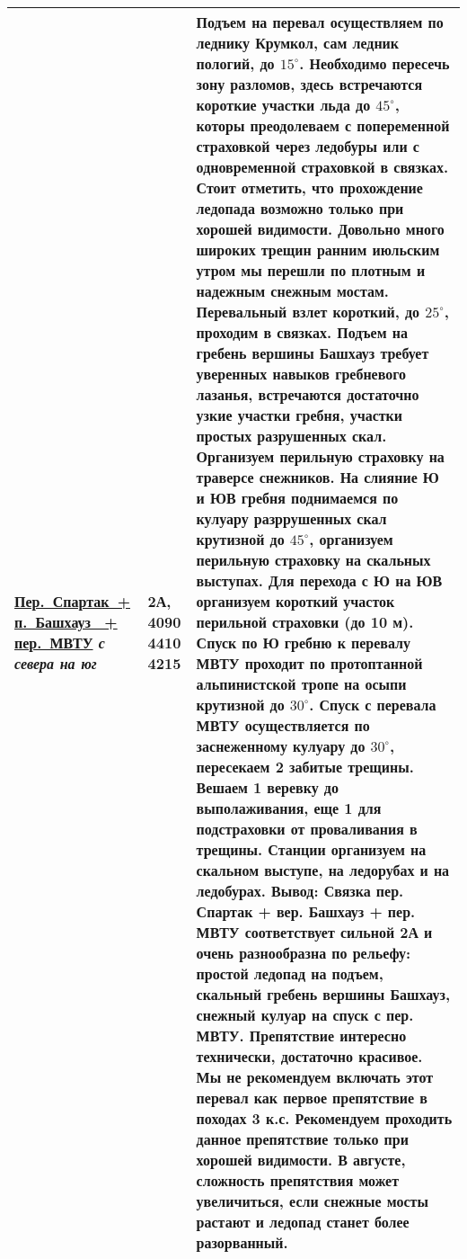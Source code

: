 {\begin{longtable}{|>{\centering\arraybackslash}m{3.8cm}|>{\centering\arraybackslash}m{1.3cm}|>{\raggedright\arraybackslash}m{12.5cm}|}
			\hyperref[subsec:Day6]{Пер.~Спартак~+ п.~Башхауз~ + пер.~МВТУ}											\newline\textit{с севера на юг}			&	2А, 4090 4410 4215			&	Подъем на перевал осуществляем по леднику Крумкол, сам ледник пологий, до $15^\circ$. Необходимо пересечь зону разломов, здесь встречаются короткие участки льда до $45^\circ$, которы преодолеваем с попеременной страховкой через ледобуры или с одновременной страховкой в связках. Стоит отметить, что прохождение ледопада возможно только при хорошей видимости. Довольно много широких трещин ранним июльским утром мы перешли по плотным и надежным снежным мостам. Перевальный взлет короткий, до $25^\circ$, проходим в связках. Подъем на гребень вершины Башхауз требует уверенных навыков гребневого лазанья, встречаются достаточно узкие участки гребня, участки простых разрушенных скал. Организуем перильную страховку на траверсе снежников. На слияние Ю и ЮВ гребня поднимаемся по кулуару разррушенных скал крутизной до $45^\circ$, организуем перильную страховку на скальных выступах. Для перехода с Ю на ЮВ организуем короткий участок перильной страховки (до 10 м). Спуск по Ю гребню к перевалу МВТУ проходит по протоптанной альпинистской тропе на осыпи крутизной до $30^\circ$. Спуск с перевала МВТУ осуществляется по заснеженному кулуару до $30^\circ$, пересекаем 2 забитые трещины. Вешаем 1 веревку до выполаживания, еще 1 для подстраховки от проваливания в трещины. Станции организуем на скальном выступе, на ледорубах и на ледобурах. \newline \textbf{Вывод:} Связка пер. Спартак + вер. Башхауз + пер. МВТУ соответствует сильной 2А и очень разнообразна по рельефу: простой ледопад на подъем, скальный гребень вершины Башхауз, снежный кулуар на спуск с пер. МВТУ. Препятствие интересно технически, достаточно красивое. Мы не рекомендуем включать этот перевал как первое препятствие в походах 3 к.с. Рекомендуем проходить данное препятствие только при хорошей видимости. В августе, сложность препятствия может увеличиться, если снежные мосты растают и ледопад станет более разорванный.																											\\ \hline

\end{longtable}}
